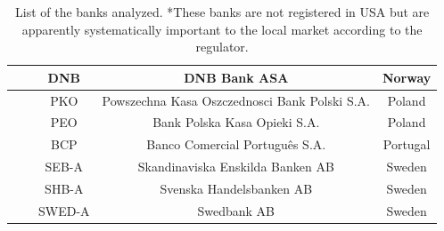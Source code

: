 \documentclass[12pt]{article}
\begin{document}
\begin{table}[!htbp]
\begin{center}
{\begin{tabular}{c|c||c |c|c}
			\hline
			& & DNB & DNB Bank ASA & Norway \\
			\hline
			& & PKO & Powszechna Kasa Oszczednosci Bank Polski S.A. & Poland \\
			\hline
			& & PEO & Bank Polska Kasa Opieki S.A. & Poland \\
			\hline
			& & BCP & Banco Comercial Português S.A. & Portugal \\
			\hline
			& & SEB-A & Skandinaviska Enskilda Banken AB & Sweden \\
			\hline
			& & SHB-A & Svenska Handelsbanken AB & Sweden \\
			\hline
			& & SWED-A & Swedbank AB & Sweden
		\end{tabular}}
	\end{center}
	\caption{List of the banks analyzed. *These banks are not registered in USA but are apparently systematically important to the local market according to the regulator. }
	\label{table:bank_list}
\end{table}
\end{document}

